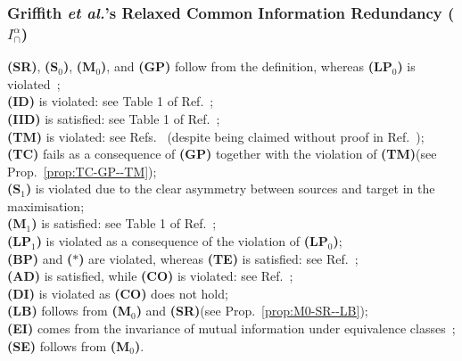 \documentclass{article}
\makeatletter
\newcommand{\etalx}{\textit{et al.\@}\xspace}
\newcommand{\ts}[1]{\ensuremath{_{\text{#1}}}}
\newcommand{\SR}{\textbf{(SR)}\xspace} %
\newcommand{\Sz}{\textbf{(S\ts{0})}\xspace} %
\newcommand{\Mz}{\textbf{(M\ts{0})}\xspace} %
\newcommand{\GP}{\textbf{(GP)}\xspace} %
\newcommand{\LPz}{\textbf{(LP\ts{0})}\xspace} %
\newcommand{\ID}{\textbf{(ID)}\xspace} %
\newcommand{\IID}{\textbf{(IID)}\xspace} %
\newcommand{\TM}{\textbf{(TM)}\xspace} %
\newcommand{\TC}{\textbf{(TC)}\xspace} %
\newcommand{\So}{\textbf{(S\ts{1})}\xspace} %
\newcommand{\Mo}{\textbf{(M\ts{1})}\xspace} %
\newcommand{\LPo}{\textbf{(LP\ts{1})}\xspace} %
\newcommand{\BP}{\textbf{(BP)}\xspace} %
\newcommand{\TE}{\textbf{(TE)}\xspace} %
\newcommand{\AST}{\textbf{($\boldsymbol{\ast}$)}\xspace} %
\newcommand{\AD}{\textbf{(AD)}\xspace} %
\newcommand{\CO}{\textbf{(CO)}\xspace} %
\newcommand{\LB}{\textbf{(LB)}\xspace} %
\newcommand{\EI}{\textbf{(EI)}\xspace} %
\newcommand{\SE}{\textbf{(SE)}\xspace} %
\newcommand{\DI}{\textbf{(DI)}\xspace}
\newcommand{\Ialpha}{\ensuremath{I_\cap^{\alpha}}\xspace}
\makeatother
\begin{document}
\subsubsection*{Griffith \etalx's Relaxed Common Information Redundancy ($\Ialpha$)}
    \SR, \Sz, \Mz, and \GP follow from the definition, whereas \LPz is violated~\cite{griffith2015quantifying}; \\
    \ID is violated: see Table 1 of Ref.~\cite{banerjee2015synergy}; \\
    \IID is satisfied: see Table 1 of Ref.~\cite{kolchinsky2022novel}; \\
    \TM is violated: see Refs.~\cite{banerjee2015synergy, kolchinsky2022novel} (despite being claimed without proof in Ref.~\cite{griffith2015quantifying}); \\ 
    \TC fails as a consequence of \GP together with the violation of \TM (see Prop.~\ref{prop:TC-GP--TM}); \\ 
    \So is violated due to the clear asymmetry between sources and target in the maximisation; \\
    \Mo is satisfied: see Table 1 of Ref.~\cite{banerjee2015synergy}; \\
    \LPo is violated as a consequence of the violation of \LPz; \\
    \BP and \AST are violated, whereas \TE is satisfied: see Ref.~\cite{kolchinsky2022novel}; \\
    \AD is satisfied, while \CO is violated: see Ref.~\cite{rauh2023continuity}; \\
    \DI is violated as \CO does not hold; \\
    \LB follows from \Mz and \SR (see Prop.~\ref{prop:M0-SR--LB}); \\
    \EI comes from the invariance of mutual information under equivalence classes~\cite{li2011connection}; \\
    \SE follows from \Mz.
    
\end{document}
